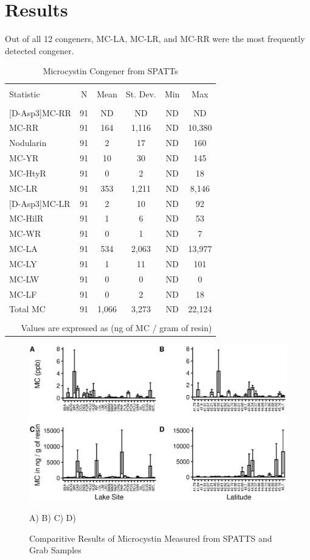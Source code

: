 \section*{Results}

Out of all 12 congeners, MC-LA, MC-LR, and MC-RR were the most frequently detected congener.

\begin{table}[!ht]
\centering
  \caption*{Microcystin Congener from SPATTs}
  \label{}
\begin{tabular}{@{\extracolsep{5pt}}lccccc}
\\[-1.8ex]\hline
\hline \\[-1.8ex]
Statistic & \multicolumn{1}{c}{N} & \multicolumn{1}{c}{Mean} & \multicolumn{1}{c}{St. Dev.} & \multicolumn{1}{c}{Min} & \multicolumn{1}{c}{Max} \\
\hline \\[-1.8ex]
{[D-Asp3]}MC-RR & 91 & ND & ND & ND & ND \\
MC-RR & 91 & 164 & 1,116 & ND & 10,380 \\
Nodularin & 91 & 2 & 17 & ND & 160 \\
MC-YR & 91 & 10 & 30 & ND & 145 \\
MC-HtyR & 91 & 0 & 2 & ND & 18 \\
MC-LR & 91 & 353 & 1,211 & ND & 8,146 \\
{[D-Asp3]}MC-LR & 91 & 2 & 10 & ND & 92 \\
MC-HilR & 91 & 1 & 6 & ND & 53 \\
MC-WR & 91 & 0 & 1 & ND & 7 \\
MC-LA & 91 & 534 & 2,063 & ND & 13,977 \\
MC-LY & 91 & 1 & 11 & ND & 101 \\
MC-LW & 91 & 0 & 0 & ND & 0 \\
MC-LF & 91 & 0 & 2 & ND & 18 \\
Total MC & 91 & 1,066 & 3,273 & ND & 22,124 \\
\hline \\[-1.8ex]
\multicolumn{6}{r}{Values are expressed as (ng of MC / gram of resin)} \\
\end{tabular}
\end{table}

\begin{figure}[!ht]
\includegraphics[width=\textwidth]{figures/spatttboxplotlake}
\label{spattbox}
\caption*{Comparitive Results of Microcystin Measured from SPATTS and Grab Samples}
A) B) C) D)
\end{figure}


\clearpage
\newpage
